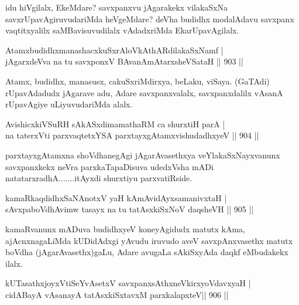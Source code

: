 \begin{artha}
idu hiVgilalx, EkeMdare? savxpanxvu jAgarakekx vilakaSxNa savxrUpavAgiruvudariMda heVgeMdare? deVha budidhx modalAdavu savxpanx vaqtitxyalilx saMBavisuvudilalx vAdadxriMda EkarUpavAgilalx.
\end{artha}


\begin{shl}
AtamxbudidhxmanashacxkuSxrAloVkAthARdilakaSxNamf | \\
jAgarxdeVva na tu savxponxV BAvanAmAtarxsheVSataH \hfill||  903 ||  
\end{shl}

\begin{artha}
Atamx, budidhx, manasusx, cakuSxriMdirxya, beLaku, viSaya. (GaTAdi) rUpavAdadudx jAgarave adu, Adare savxpanxvalalx, savxpanxdalilx vAsanA rUpavAgiye uLiyuvudariMda alalx.
\end{artha}

\begin{shl}
AvishicxkiVSuRH sAkASxdimamathaRM ca shurxtiH parA | \\
na taterxVti parxvaqtetxYSA parxtayxgAtamxvishudadhxyeV \hfill||  904 ||  
\end{shl}

\begin{artha}
parxtayxgAtamxna shoVdhanegAgi jAgarAvasethxya veYlakaSxNayxvanunx savxpanxkekx neVra parxkaTapaDisuva udedxVsha mADi natatarxradhA.......itAyxdi shurxtiyu parxvatiRside.
\end{artha}


\begin{shl}
kamaRkaqdidhxSaNAnotxV yaH kAmAvidAyxsamanivxtaH | \\
sAvxpaboVdhAvimw tasayx na tu tatAsxkiSxNoV daqsheVH \hfill||  905 ||  
\end{shl}

\begin{artha}
kamaRvanunx mADuva budidhxyeV koneyAgidudx matutx kAma, ajAcnxnagaLiMda kUDidAdxgi yAvudu iruvudo aveV savxpAnxvasethx matutx boVdha (jAgarAvasethx)gaLu, Adare avugaLa sAkiSxyAda daqkf eMbudakekx ilalx.
\end{artha}


\begin{shl}
kUTasathxjoyxVtiSeYvA\s \s setxV savxpanxsAthxneV\s kirxyoV\s davxyaH | \\
cidABayA vAsanayA tatAsxkiSxtavxM parxkalapxteV\hfill ||  906 ||  
\end{shl}

